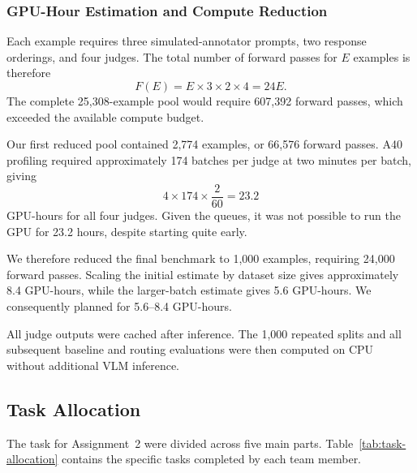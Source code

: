 \documentclass[11pt]{article}
\begin{document}
\subsubsection{GPU-Hour Estimation and Compute Reduction}

Each example requires three simulated-annotator prompts, two response
orderings, and four judges. The total number of forward passes for $E$
examples is therefore
\[
F(E)=E\times3\times2\times4=24E.
\]
The complete 25,308-example pool would require 607,392 forward passes, which
exceeded the available compute budget.

Our first reduced pool contained 2,774 examples, or 66,576 forward passes.
A40 profiling required approximately 174 batches per judge at two minutes per
batch, giving
\[
4\times174\times\frac{2}{60}=23.2
\]
GPU-hours for all four judges. Given the queues, it was not possible to run the GPU for 23.2 hours, despite starting quite early. 

We therefore reduced the final benchmark to 1,000 examples, requiring 24,000
forward passes. Scaling the initial estimate by dataset size gives
approximately 8.4 GPU-hours, while the larger-batch estimate gives 5.6
GPU-hours. We consequently planned for 5.6--8.4 GPU-hours.

All judge outputs were cached after inference. The 1,000 repeated splits and
all subsequent baseline and routing evaluations were then computed on CPU
without additional VLM inference.



\subsection{Task Allocation}
The task for Assignment~2 were divided across five main parts. Table~\ref{tab:task-allocation} contains the specific tasks completed by each team member.
\end{document}
